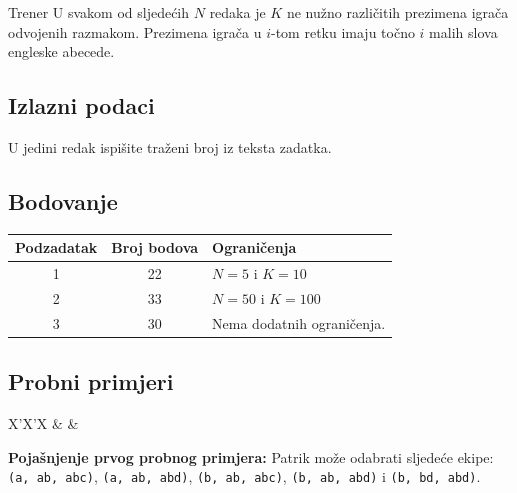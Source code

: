 \begin{statement}[
  problempoints=110,
  timelimit=1 sekunda,
  memorylimit=512 MiB,
]{Trener}
U svakom od sljedećih $N$ redaka je $K$ ne nužno različitih prezimena igrača
odvojenih razmakom. Prezimena igrača u $i$-tom retku imaju točno $i$ malih slova
engleske abecede.

\subsection*{Izlazni podaci}
U jedini redak ispišite traženi broj iz teksta zadatka.

\subsection*{Bodovanje}
{\renewcommand{\arraystretch}{1.4}
  \setlength{\tabcolsep}{6pt}
  \begin{tabular}{ccl}
 Podzadatak & Broj bodova & Ograničenja \\ \midrule
  1 & 22 & $N = 5$ i $K = 10$ \\
  2 & 33 & $N = 50$ i $K = 100$\\
  3 & 30 & Nema dodatnih ograničenja. \\
\end{tabular}}

\subsection*{Probni primjeri}
\begin{tabularx}{\textwidth}{X'X'X}
 &
 &
\end{tabularx}

\textbf{Pojašnjenje prvog probnog primjera:}
Patrik može odabrati sljedeće ekipe: \texttt{(a, ab, abc)}, \texttt{(a, ab, abd)},
\texttt{(b, ab, abc)}, \texttt{(b, ab, abd)} i \texttt{(b, bd, abd)}.

\end{statement}


